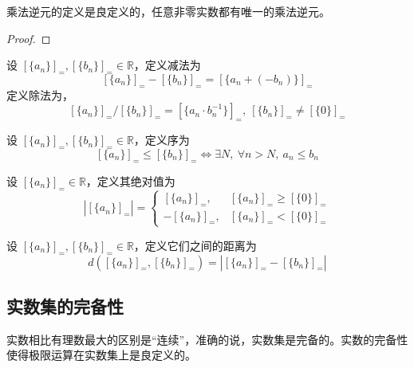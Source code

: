 \begin{proposition}
    乘法逆元的定义是良定义的，任意非零实数都有唯一的乘法逆元。
\end{proposition}

\begin{proof}
    
\end{proof}

\begin{definition}[实数的减法和除法]
    设 $[\{a_n\}]_{=},[\{b_n\}]_{=}\in\mathbb{R}$，定义减法为
    \[
        [\{a_n\}]_{=} - [\{b_n\}]_{=} = [\{a_n + (-b_n)\}]_{=}
    \]
    定义除法为，
    \[
        [\{a_n\}]_{=} / [\{b_n\}]_{=} = [\{a_n \cdot b_n^{-1}\}]_{=},\ [\{b_n\}]_{=}\neq [\{0\}]_{=}
    \]
\end{definition}
\vspace{1em}

\begin{definition}
    设 $[\{a_n\}]_{=},[\{b_n\}]_{=}\in\mathbb{R}$，定义序为
    \[
        [\{a_n\}]_{=} \le [\{b_n\}]_{=} \iff \exists N,\ \forall n>N,\ a_n \le b_n
    \]
\end{definition}

\begin{definition}
    设 $[\{a_n\}]_{=}\in\mathbb{R}$，定义其绝对值为
    \[
        |[\{a_n\}]_{=}| = 
        \begin{cases}
            [\{a_n\}]_{=}, & [\{a_n\}]_{=} \ge [\{0\}]_{=} \\
            -[\{a_n\}]_{=}, & [\{a_n\}]_{=} < [\{0\}]_{=}
        \end{cases}
    \]
\end{definition}

\begin{definition}
    设 $[\{a_n\}]_{=},[\{b_n\}]_{=}\in\mathbb{R}$，定义它们之间的距离为
    \[
        d([\{a_n\}]_{=},[\{b_n\}]_{=}) = |[\{a_n\}]_{=} - [\{b_n\}]_{=}|
    \]
\end{definition}

\vspace{1em}
\subsection{实数集的完备性}
实数相比有理数最大的区别是“连续”，准确的说，实数集是完备的。实数的完备性使得极限运算在实数集上是良定义的。
\vspace{1em}

